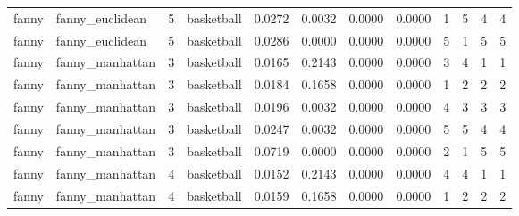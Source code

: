 {\begin{longtable}{| p{1cm} | p{1.8cm} | p{0.7cm} | p{0.9cm} | p{0.5cm} | p{0.65cm} | p{0.5cm} | p{0.5cm} | p{0.55cm} | p{0.55cm} | p{0.6cm} | p{0.5cm} |}
\scriptsize   fanny   & \scriptsize  fanny\_euclidean & \scriptsize    5    & \scriptsize basketball & \scriptsize    0.0272  &  \scriptsize 0.0032 & \scriptsize 0.0000 & \scriptsize    0.0000 & \scriptsize   1  & \scriptsize    5  & \scriptsize    4  & \scriptsize    4 \\
\scriptsize   fanny   & \scriptsize  fanny\_euclidean & \scriptsize    5    & \scriptsize basketball & \scriptsize    0.0286  &  \scriptsize 0.0000 & \scriptsize 0.0000 & \scriptsize    0.0000 & \scriptsize   5  & \scriptsize    1  & \scriptsize    5  & \scriptsize    5 \\
\cline{2-12}
\scriptsize   fanny   & \scriptsize  fanny\_manhattan & \scriptsize    3    & \scriptsize basketball & \scriptsize    0.0165  &  \scriptsize 0.2143 & \scriptsize 0.0000 & \scriptsize    0.0000 & \scriptsize   3  & \scriptsize    4  & \scriptsize    1  & \scriptsize    1 \\
\scriptsize   fanny   & \scriptsize  fanny\_manhattan & \scriptsize    3    & \scriptsize basketball & \scriptsize    0.0184  &  \scriptsize 0.1658 & \scriptsize 0.0000 & \scriptsize    0.0000 & \scriptsize   1  & \scriptsize    2  & \scriptsize    2  & \scriptsize    2 \\
\scriptsize   fanny   & \scriptsize  fanny\_manhattan & \scriptsize    3    & \scriptsize basketball & \scriptsize    0.0196  &  \scriptsize 0.0032 & \scriptsize 0.0000 & \scriptsize    0.0000 & \scriptsize   4  & \scriptsize    3  & \scriptsize    3  & \scriptsize    3 \\
\scriptsize   fanny   & \scriptsize  fanny\_manhattan & \scriptsize    3    & \scriptsize basketball & \scriptsize    0.0247  &  \scriptsize 0.0032 & \scriptsize 0.0000 & \scriptsize    0.0000 & \scriptsize   5  & \scriptsize    5  & \scriptsize    4  & \scriptsize    4 \\
\scriptsize   fanny   & \scriptsize  fanny\_manhattan & \scriptsize    3    & \scriptsize basketball & \scriptsize    0.0719  &  \scriptsize 0.0000 & \scriptsize 0.0000 & \scriptsize    0.0000 & \scriptsize   2  & \scriptsize    1  & \scriptsize    5  & \scriptsize    5 \\
\cline{3-12}
\scriptsize   fanny   & \scriptsize  fanny\_manhattan & \scriptsize    4    & \scriptsize basketball & \scriptsize    0.0152  &  \scriptsize 0.2143 & \scriptsize 0.0000 & \scriptsize    0.0000 & \scriptsize   4  & \scriptsize    4  & \scriptsize    1  & \scriptsize    1 \\
\scriptsize   fanny   & \scriptsize  fanny\_manhattan & \scriptsize    4    & \scriptsize basketball & \scriptsize    0.0159  &  \scriptsize 0.1658 & \scriptsize 0.0000 & \scriptsize    0.0000 & \scriptsize   1  & \scriptsize    2  & \scriptsize    2  & \scriptsize    2 \\

\end{longtable}}
